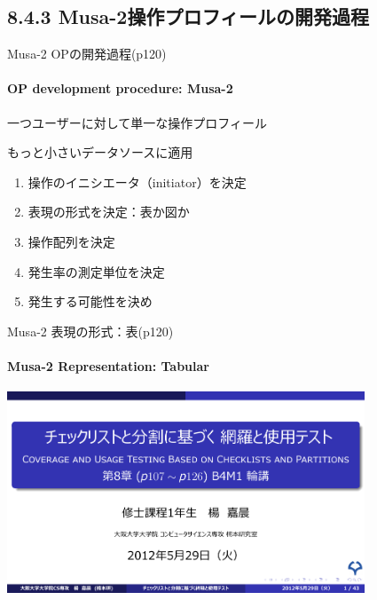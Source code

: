 \subsection{8.4.3 Musa-2操作プロフィールの開発過程}
\begin{frame}{Musa-2 OPの開発過程(p120)}
\framesubtitle{OP development procedure: Musa-2}
\begin{definationfc}[Musa-2]
一つユーザーに対して単一な操作プロフィール

もっと小さいデータソースに適用
\end{definationfc}

\pause
\begin{enumerate}
\item 操作のイニシエータ（initiator）を決定
\item 表現の形式を決定：\alert<3->{表か図か}
\item 操作配列を決定
\item 発生率の測定単位を決定
\item 発生する可能性を決め
\end{enumerate}
\end{frame}
\begin{frame}{Musa-2 表現の形式：表(p120)}
\framesubtitle{Musa-2 Representation: Tabular}
\begin{center}
\includegraphics[width=0.8\textwidth,page=51]{figure/include.pdf}
\end{center}
\end{frame}
